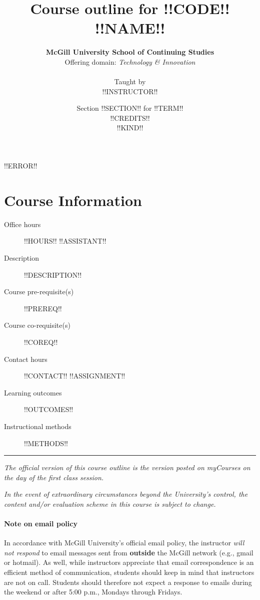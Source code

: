 \documentclass{article}
\title{Course outline for !!CODE!! \\ {\sc !!NAME!!}}
\date{Section !!SECTION!! for !!TERM!! \\ !!CREDITS!! \\ !!KIND!!}
\author{{\bf McGill University School of Continuing Studies} \\
  Offering domain: {\em Technology \& Innovation} \\
  \\ Taught by \\ !!INSTRUCTOR!! }
\begin{document}
\maketitle

\thispagestyle{fancy}

!!ERROR!!

\newpage

\tableofcontents
{}

\newpage

\section{Course Information}

\begin{description}
\item[Office hours]{ !!HOURS!!}
!!ASSISTANT!!
\item[Description]{ !!DESCRIPTION!! }
\item[Course pre-requisite(s)]{!!PREREQ!!}
\item[Course co-requisite(s)]{!!COREQ!!}
\item[Contact hours]{!!CONTACT!!}
!!ASSIGNMENT!!
\item[Learning outcomes]{ !!OUTCOMES!! }
\item[Instructional methods]{ !!METHODS!! }

\end{description}


\vfill

\hrule
 
{\em The official version of this course outline is the version posted
  on myCourses on the day of the first class session.}

{\em In the event of extraordinary circumstances beyond the
  University's control, the content and/or evaluation scheme in this
  course is subject to change.}

\newpage

\paragraph{Note on email policy}

In accordance with McGill University’s official email
policy, the instructor {\em will not respond} to email messages sent
from {\bf outside} the McGill network (e.g., gmail or hotmail). As
well, while instructors appreciate that email correspondence is an
efficient method of communication, students should keep in mind that
instructors are not on call. Students should therefore not expect a
response to emails during the weekend or after 5:00 p.m., Mondays
through Fridays.
\end{document}
